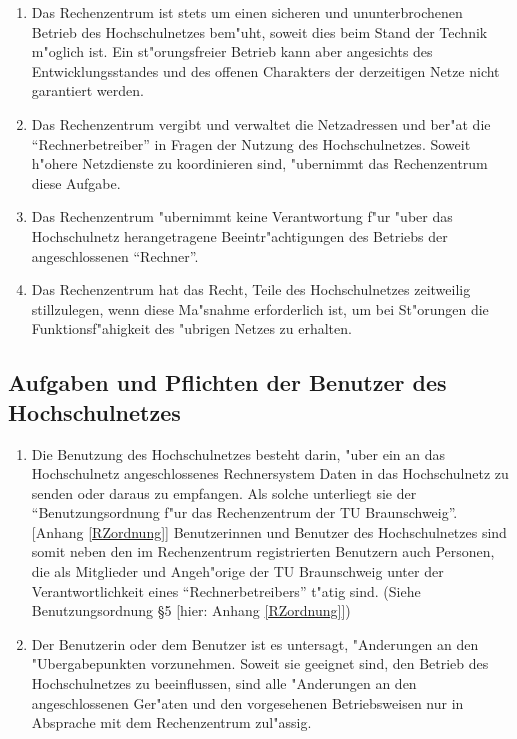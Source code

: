 \documentclass[12pt,titlepage,twoside]{scrartcl}
\begin{document}
\begin{appendix}
\begin{enumerate}
  \item Das Rechenzentrum ist stets um einen sicheren und
    ununterbrochenen Betrieb des Hochschulnetzes bem"uht,
    soweit dies beim Stand der Technik m"oglich ist.
    Ein st"orungsfreier Betrieb kann aber angesichts des
    Entwicklungsstandes und des offenen Charakters der
    derzeitigen Netze nicht garantiert werden.

  \item Das Rechenzentrum vergibt und verwaltet die Netzadressen
    und ber"at die "`Rechnerbetreiber"' in Fragen der Nutzung
    des Hochschulnetzes. Soweit h"ohere Netzdienste zu
    koordinieren sind, "ubernimmt das Rechenzentrum
    diese Aufgabe.

  \item Das Rechenzentrum "ubernimmt keine Verantwortung
    f"ur "uber das Hochschulnetz herangetragene
    Beeintr"achtigungen des Betriebs der angeschlossenen
    "`Rechner"'.

  \item Das Rechenzentrum hat das Recht, Teile des Hochschulnetzes
    zeitweilig stillzulegen, wenn diese Ma"snahme
    erforderlich ist, um bei St"orungen die
    Funktionsf"ahigkeit des "ubrigen Netzes zu erhalten.
\end{enumerate}

\subsection{Aufgaben und Pflichten der Benutzer des Hochschulnetzes}

\begin{enumerate}
  \item Die Benutzung des Hochschulnetzes besteht darin, "uber
    ein an das Hochschulnetz angeschlossenes Rechnersystem Daten
    in das Hochschulnetz zu senden oder daraus zu empfangen.
    Als solche unterliegt sie der "`Benutzungsordnung f"ur das
    Rechenzentrum der TU Braunschweig"'. [Anhang \ref{RZordnung}]
    Benutzerinnen und Benutzer des Hochschulnetzes sind somit neben den im
    Rechenzentrum registrierten Benutzern auch Personen, die als Mitglieder
    und Angeh"orige der TU Braunschweig unter der Verantwortlichkeit eines
    "`Rechnerbetreibers"' t"atig sind. (Siehe Benutzungsordnung \S{}5 [hier:
    Anhang \ref{RZordnung}])

  \item Der Benutzerin oder dem Benutzer ist es untersagt,
    "Anderungen an den "Ubergabepunkten vorzunehmen.
    Soweit sie geeignet sind, den Betrieb des Hochschulnetzes
    zu beeinflussen, sind alle "Anderungen an den
    angeschlossenen Ger"aten und den vorgesehenen
    Betriebsweisen nur in Absprache mit dem Rechenzentrum
    zul"assig.


\end{enumerate}
\end{appendix}
\end{document}
